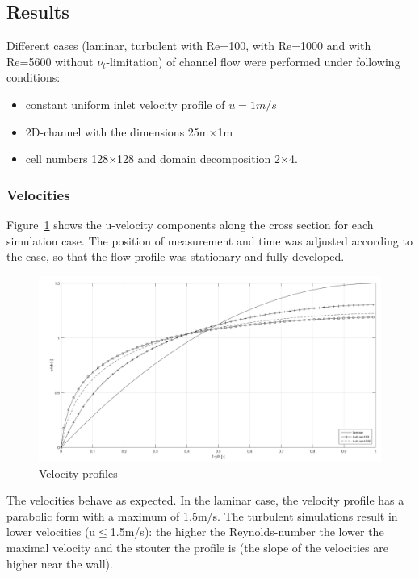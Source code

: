 \documentclass[11pt,a4paper]{article}
\begin{document}
\clearpage


\subsection{Results}
Different cases (laminar, turbulent with Re=100, with Re=1000 and with Re=5600 without $\nu_t$-limitation) of channel flow were performed under following conditions:
\begin{itemize}
\item constant uniform inlet velocity profile of $u=1m/s$
\item 2D-channel with the dimensions 25m$\times$1m
\item cell numbers 128$\times$128 and domain decomposition 2$\times$4.
\end{itemize}

\subsubsection{Velocities}
\noindent Figure~\ref{fig:vels} shows the u-velocity components along the cross section for each simulation case. The position of measurement and time was adjusted according to the case, so that the flow profile was stationary and fully developed.

\begin{figure}[h]
    \centering
    \includegraphics[width=1.0\textwidth]{velocities}
    \caption{Velocity profiles}
    \label{fig:vels}
\end{figure}

\noindent The velocities behave as expected. In the laminar case, the velocity profile has a parabolic form with a maximum of 1.5m/s. The turbulent simulations result in lower velocities (u$\le$1.5m/s): the higher the Reynolds-number the lower  the maximal velocity and the stouter the profile is (the slope of the velocities are higher near the wall).
\end{document}
